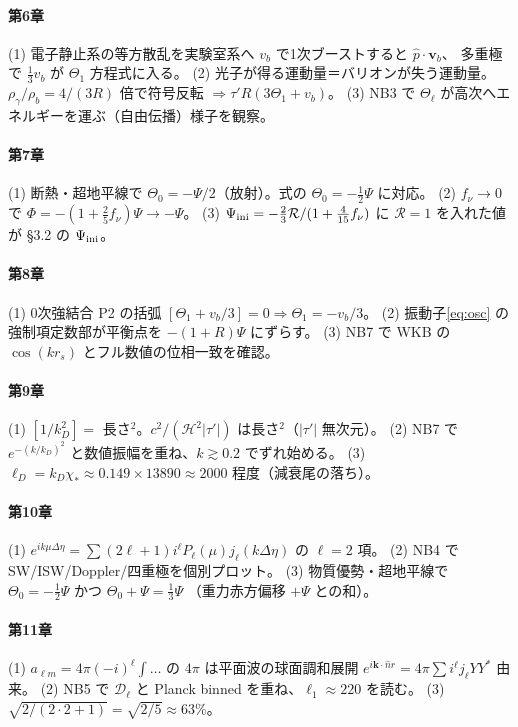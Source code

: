 \paragraph{第6章}
(1) 電子静止系の等方散乱を実験室系へ $v_b$ で1次ブーストすると $\hat p\cdot\mathbf v_b$、
多重極で $\tfrac13v_b$ が $\Theta_1$ 方程式に入る。
(2) 光子が得る運動量＝バリオンが失う運動量。$\rho_\gamma/\rho_b=4/(3R)$ 倍で符号反転 $\Rightarrow\tau'R(3\Theta_1+v_b)$。
(3) NB3 で $\Theta_\ell$ が高次へエネルギーを運ぶ（自由伝播）様子を観察。

\paragraph{第7章}
(1) 断熱・超地平線で $\Theta_0=-\Psi/2$（放射）。式の $\Theta_0=-\tfrac12\Psi$ に対応。
(2) $f_\nu\to0$ で $\Phi=-(1+\tfrac25 f_\nu)\Psi\to-\Psi$。
(3) $\Psi_{\rm ini}=-\tfrac23\mathcal R/(1+\tfrac4{15}f_\nu)$ に $\mathcal R=1$ を入れた値が
\S3.2 の $\Psi_{\rm ini}$。

\paragraph{第8章}
(1) 0次強結合 P2 の括弧 $[\Theta_1+v_b/3]=0\Rightarrow\Theta_1=-v_b/3$。
(2) 振動子\eqref{eq:osc} の強制項定数部が平衡点を $-(1+R)\Psi$ にずらす。
(3) NB7 で WKB の $\cos(kr_s)$ とフル数値の位相一致を確認。

\paragraph{第9章}
(1) $[1/k_D^2]=$ 長さ$^2$。$c^2/(\mathcal H^2|\tau'|)$ は長さ$^2$（$|\tau'|$ 無次元）。
(2) NB7 で $e^{-(k/k_D)^2}$ と数値振幅を重ね、$k\gtrsim0.2$ でずれ始める。
(3) $\ell_D=k_D\chi_*\approx0.149\times13890\approx2000$ 程度（減衰尾の落ち）。

\paragraph{第10章}
(1) $e^{ik\mu\Delta\eta}=\sum(2\ell+1)i^\ell P_\ell(\mu)j_\ell(k\Delta\eta)$ の $\ell=2$ 項。
(2) NB4 で SW/ISW/Doppler/四重極を個別プロット。
(3) 物質優勢・超地平線で $\Theta_0=-\tfrac12\Psi$ かつ $\Theta_0+\Psi=\tfrac13\Psi$
（重力赤方偏移 $+\Psi$ との和）。

\paragraph{第11章}
(1) $a_{\ell m}=4\pi(-i)^\ell\int\ldots$ の $4\pi$ は平面波の球面調和展開
$e^{i\mathbf k\cdot\hat n r}=4\pi\sum i^\ell j_\ell Y Y^*$ 由来。
(2) NB5 で $\mathcal D_\ell$ と Planck binned を重ね、$\ell_1\approx220$ を読む。
(3) $\sqrt{2/(2\cdot2+1)}=\sqrt{2/5}\approx63\%$。

